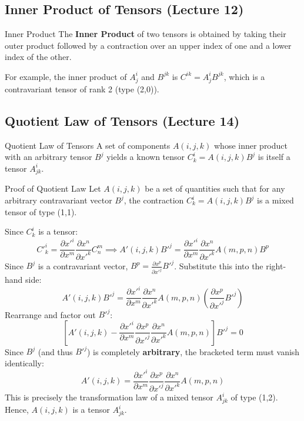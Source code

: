 \documentclass[11pt,a4paper]{article}
\begin{document}
\subsection{Inner Product of Tensors (Lecture 12)}
\begin{definitionbox}{Inner Product}
The \textbf{Inner Product} of two tensors is obtained by taking their outer product followed by a contraction over an upper index of one and a lower index of the other.
\end{definitionbox}
For example, the inner product of $A^i_j$ and $B^{jk}$ is $C^{ik} = A^i_j B^{jk}$, which is a contravariant tensor of rank 2 (type (2,0)).

\subsection{Quotient Law of Tensors (Lecture 14)}
\begin{theorembox}{Quotient Law of Tensors}
A set of components $A(i,j,k)$ whose inner product with an arbitrary tensor $B^j$ yields a known tensor $C^i_k = A(i,j,k) B^j$ is itself a tensor $A^i_{jk}$.
\end{theorembox}
\begin{proofbox}{Proof of Quotient Law}
Let $A(i,j,k)$ be a set of quantities such that for any arbitrary contravariant vector $B^j$, the contraction $C^i_k = A(i,j,k) B^j$ is a mixed tensor of type (1,1).

Since $C^i_k$ is a tensor:
\[
C'^i_k = \frac{\partial x'^i}{\partial x^m} \frac{\partial x^n}{\partial x'^k} C^m_n \implies A'(i,j,k) B'^j = \frac{\partial x'^i}{\partial x^m} \frac{\partial x^n}{\partial x'^k} A(m,p,n) B^p
\]
Since $B^j$ is a contravariant vector, $B^p = \frac{\partial x^p}{\partial x'^j} B'^j$. Substitute this into the right-hand side:
\[
A'(i,j,k) B'^j = \frac{\partial x'^i}{\partial x^m} \frac{\partial x^n}{\partial x'^k} A(m,p,n) \left( \frac{\partial x^p}{\partial x'^j} B'^j \right)
\]
Rearrange and factor out $B'^j$:
\[
\left[ A'(i,j,k) - \frac{\partial x'^i}{\partial x^m} \frac{\partial x^p}{\partial x'^j} \frac{\partial x^n}{\partial x'^k} A(m,p,n) \right] B'^j = 0
\]
Since $B^j$ (and thus $B'^j$) is completely \textbf{arbitrary}, the bracketed term must vanish identically:
\[
A'(i,j,k) = \frac{\partial x'^i}{\partial x^m} \frac{\partial x^p}{\partial x'^j} \frac{\partial x^n}{\partial x'^k} A(m,p,n)
\]
This is precisely the transformation law of a mixed tensor $A^i_{jk}$ of type (1,2). Hence, $A(i,j,k)$ is a tensor $A^i_{jk}$.
\end{proofbox}
\end{document}
